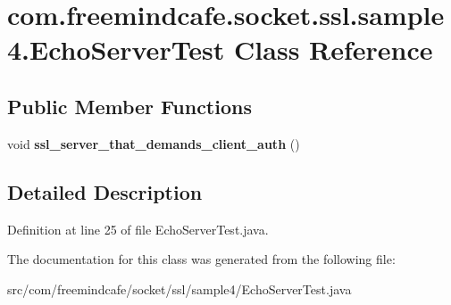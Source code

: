 \hypertarget{classcom_1_1freemindcafe_1_1socket_1_1ssl_1_1sample4_1_1_echo_server_test}{}\section{com.\+freemindcafe.\+socket.\+ssl.\+sample4.\+Echo\+Server\+Test Class Reference}
\label{classcom_1_1freemindcafe_1_1socket_1_1ssl_1_1sample4_1_1_echo_server_test}
\subsection*{Public Member Functions}
\begin{DoxyCompactItemize}
\item 
\hypertarget{classcom_1_1freemindcafe_1_1socket_1_1ssl_1_1sample4_1_1_echo_server_test_a035cbe6f1e8b65ec85cd4e3ca1dd281d}{}void {\bfseries ssl\+\_\+server\+\_\+that\+\_\+demands\+\_\+client\+\_\+auth} ()\label{classcom_1_1freemindcafe_1_1socket_1_1ssl_1_1sample4_1_1_echo_server_test_a035cbe6f1e8b65ec85cd4e3ca1dd281d}

\end{DoxyCompactItemize}


\subsection{Detailed Description}


Definition at line 25 of file Echo\+Server\+Test.\+java.



The documentation for this class was generated from the following file\+:\begin{DoxyCompactItemize}
\item 
src/com/freemindcafe/socket/ssl/sample4/Echo\+Server\+Test.\+java\end{DoxyCompactItemize}
